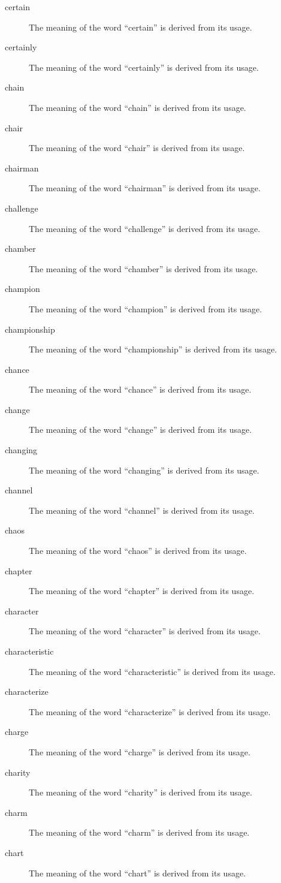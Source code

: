 \documentclass[12pt, letterpaper]{memoir}
\begin{document}
\begin{description}
\item[certain] The meaning of the word ``certain'' is derived from its usage.
\item[certainly] The meaning of the word ``certainly'' is derived from its usage.
\item[chain] The meaning of the word ``chain'' is derived from its usage.
\item[chair] The meaning of the word ``chair'' is derived from its usage.
\item[chairman] The meaning of the word ``chairman'' is derived from its usage.
\item[challenge] The meaning of the word ``challenge'' is derived from its usage.
\item[chamber] The meaning of the word ``chamber'' is derived from its usage.
\item[champion] The meaning of the word ``champion'' is derived from its usage.
\item[championship] The meaning of the word ``championship'' is derived from its usage.
\item[chance] The meaning of the word ``chance'' is derived from its usage.
\item[change] The meaning of the word ``change'' is derived from its usage.
\item[changing] The meaning of the word ``changing'' is derived from its usage.
\item[channel] The meaning of the word ``channel'' is derived from its usage.
\item[chaos] The meaning of the word ``chaos'' is derived from its usage.
\item[chapter] The meaning of the word ``chapter'' is derived from its usage.
\item[character] The meaning of the word ``character'' is derived from its usage.
\item[characteristic] The meaning of the word ``characteristic'' is derived from its usage.
\item[characterize] The meaning of the word ``characterize'' is derived from its usage.
\item[charge] The meaning of the word ``charge'' is derived from its usage.
\item[charity] The meaning of the word ``charity'' is derived from its usage.
\item[charm] The meaning of the word ``charm'' is derived from its usage.
\item[chart] The meaning of the word ``chart'' is derived from its usage.

\end{description}
\end{document}
